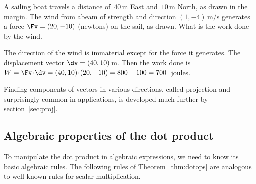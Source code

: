 \begin{example} \label{eg:}
A sailing boat travels a distance of~\(40\)\,m East and~\(10\)\,m North, as drawn in the margin.
The wind from abeam of strength and direction \((1,-4)\)\,m/s generates a force \(\Fv=(20,-10)\) (newtons) on the sail, as drawn.
What is the work done by the wind.
\begin{solution} 
The direction of the wind is immaterial except for the force it generates.
The displacement vector \(\dv=(40,10)\)\,m.
Then the work done is \(W=\Fv\cdot\dv =(40,10)\cdot(20,-10) =800-100 =700\)~joules.
\end{solution}
\end{example}


Finding components of vectors in various directions, called projection and surprisingly common in applications, is developed much further by section~\ref{sec:proj}.






\subsection{Algebraic properties of the dot product}
\label{sec:apdp}


To manipulate the dot product in algebraic expressions, we need to know its basic algebraic rules.
The following rules of Theorem~\ref{thm:dotops} are analogous to well known rules for scalar multiplication.


